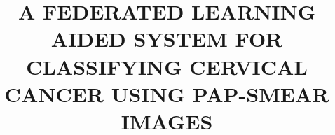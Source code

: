 \documentclass[final,print]{packages/mistthesis}
\title{A FEDERATED LEARNING AIDED SYSTEM FOR CLASSIFYING CERVICAL CANCER USING PAP-SMEAR IMAGES}
\author{\parbox{\textwidth}{\centering\@FirstStudent}}
\author{\ifdefined\@FirstStudent
	\parbox{\textwidth}{\centering\@FirstStudent}\fi\newline
	\ifdefined\@SecondStudent
	\parbox{\textwidth}{\centering\@SecondStudent}\fi\newline
	\ifdefined\@ThirdStudent
	\parbox{\textwidth}{\centering\@ThirdStudent}\fi}%
\makeatletter
\newcommand\blankpage{
	\null
	\thispagestyle{empty}
	\addtocounter{page}{-1}
	\newpage
}
\let\theStudyType\@StudyType
\makeatother
\begin{document}
	\maketitle
	\frontmatter
	
	
	
	
	
	
	\ifdefined\theStudyType
	\fi
    \tableofcontents
	\renewcommand\listfigurename{LIST OF FIGURES}
	\listoffigures
	\renewcommand\listtablename{LIST OF TABLES}
	\listoftables
    \newpage
    \listofalgorithms
	
	
	
	\ifdefined\theStudyType
	
	\fi

	
	
	\mainmatter{ 
		\doublespacing
		
		
		
		
		
		
		
		
		
		
		
		
		
	}
	
\end{document}
